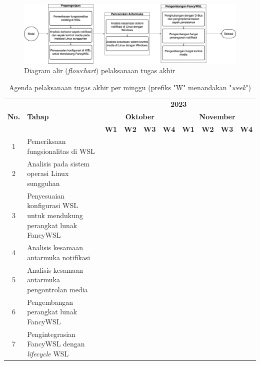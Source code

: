 \begin{figure}
    \centering
    \includegraphics[width=1\linewidth]{assets/alur-pengerjaan-v2.png}
    \caption{Diagram alir (\textit{flowchart}) pelaksanaan tugas akhir}
    \label{diagram-alir-pelaksanaan}
\end{figure}

\begin{table}
    \centering
    \caption{Agenda pelaksanaan tugas akhir per minggu (prefiks "W" menandakan "\textit{week}")}
    \label{tabel-agenda-pelaksanaan}
    \begin{tabular}{|c|p{4cm}|c|c|c|c|c|c|c|c|} \hline 
        \multirow{3}{*}{\textbf{No.}} & \multirow{3}{*}{\textbf{Tahap}} & \multicolumn{8}{c|}{\textbf{2023}}\\ \cline{3-10} 
        & & \multicolumn{4}{c|}{\textbf{Oktober}} & \multicolumn{4}{c|}{\textbf{November}}\\ \cline{3-10} 
        & & \textbf{W1} & \textbf{W2} & \textbf{W3} & \textbf{W4} & \textbf{W1} & \textbf{W2} & \textbf{W3} & \textbf{W4}\\ \hline 
        1 & Pemeriksaan fungsionalitas di WSL & \cellcolor{black} &  &  &  &  &  &  & \\ \hline 
        2 & Analisis pada sistem operasi Linux sungguhan & \cellcolor{black} & \cellcolor{black} &  &  &  &  &  & \\ \hline 
        3 & Penyesuaian konfigurasi WSL untuk mendukung perangkat lunak FancyWSL &  &  & \cellcolor{black} & \cellcolor{black} &  &  &  & \\ \hline 
        4 & Analisis kesamaan antarmuka notifikasi &  &  & \cellcolor{black} & \cellcolor{black} & \cellcolor{black} & &  & \\ \hline 
        5 & Analisis kesamaan antarmuka pengontrolan media &  &  & \cellcolor{black} & \cellcolor{black} & \cellcolor{black} &  &  & \\ \hline 
        6 & Pengembangan perangkat lunak FancyWSL &  &  &  &  & \cellcolor{black} & \cellcolor{black} & \cellcolor{black} & \cellcolor{black}\\ \hline 
        7 & Pengintegrasian FancyWSL dengan \textit{lifecycle} WSL &  &  &  &  &  &  &  & \cellcolor{black}\\ \hline 
    \end{tabular}
\end{table}

